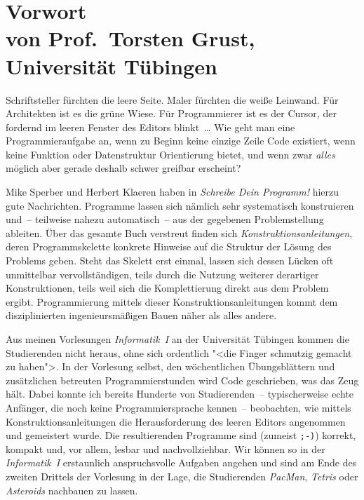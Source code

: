 
\chapter*{Vorwort\\
\normalsize von Prof.\ Torsten Grust, Universität Tübingen}
\thispagestyle{empty}


Schriftsteller fürchten die leere Seite.  Maler fürchten die weiße
Leinwand.  Für Architekten ist es die grüne Wiese.  Für Programmierer
ist es der Cursor, der fordernd im leeren Fenster des Editors
blinkt~\ldots{} Wie geht man eine Programmieraufgabe an, wenn zu Beginn
keine einzige Zeile Code existiert, wenn keine Funktion oder
Datenstruktur Orientierung bietet, und wenn zwar \emph{alles} möglich
aber gerade deshalb schwer greifbar erscheint?

Mike Sperber und Herbert Klaeren haben in \textit{Schreibe Dein
Programm!} hierzu gute Nachrichten.  Programme lassen sich nämlich sehr
systematisch konstruieren und~-- teilweise nahezu auto\-ma\-tisch~-- aus der
gegebenen Problemstellung ableiten.  Über das gesamte Buch verstreut
finden sich \textit{Konstruktionsanleitungen}, deren Programmskelette
konkrete Hinweise auf die Struktur der Lösung des Problems geben.  Steht
das Skelett erst einmal, lassen sich dessen Lücken oft unmittelbar
vervollständigen, teils durch die Nutzung weiterer derartiger
Konstruktionen, teils weil sich die Komplettierung direkt aus dem
Problem ergibt.  Programmierung mittels dieser Konstruktions\-anleitungen
kommt dem disziplinierten ingenieursmäßigen Bauen näher als alles
andere.

Aus meinen Vorlesungen \textit{Informatik~I} an der Universität Tübingen
kommen die Studierenden nicht heraus, ohne sich ordentlich "<die Finger
schmutzig gemacht zu haben">.  In der Vor\-lesung selbst, den
wöchentlichen Übungsblättern und zusätzlichen betreuten
Programmierstunden wird Code geschrieben, was das Zeug hält.  Dabei
konnte ich bereits Hunderte von Studierenden~-- typischerweise echte
Anfänger, die noch keine Programmiersprache kennen~-- beobachten, wie
mittels Konstruktionsanleitungen die Herausforderung des leeren Editors
angenommen und gemeistert wurde.  Die resultierenden Programme sind
(zumeist \texttt{;-)}) korrekt, kompakt und, vor allem, lesbar und
nachvollziehbar.  Wir können so in der \textit{Informatik~I} erstaunlich
anspruchsvolle Auf\-gaben angehen und sind am Ende des zweiten
Drittels der Vorlesung in der Lage, die Studierenden \textit{PacMan},
\textit{Tetris} oder \textit{Asteroids} nachbauen zu lassen.

